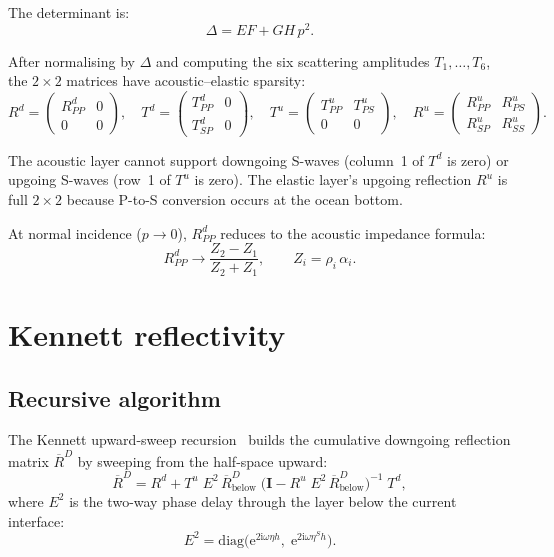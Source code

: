 \documentclass[11pt,a4paper]{article}
\newcommand{\D}{\Delta}
\newcommand{\ee}{\mathrm{e}}
\newcommand{\ii}{\mathrm{i}}
\begin{document}
The determinant is:
\begin{equation}
  \D = EF + GH\,p^2.
\end{equation}

After normalising by $\D$ and computing the six scattering amplitudes
$T_1, \ldots, T_6$, the $2\times 2$ matrices have
acoustic--elastic sparsity:
\begin{equation}\label{eq:Rd_sparse}
  R^d = \begin{pmatrix} R^d_{PP} & 0 \\ 0 & 0 \end{pmatrix}, \quad
  T^d = \begin{pmatrix} T^d_{PP} & 0 \\ T^d_{SP} & 0 \end{pmatrix}, \quad
  T^u = \begin{pmatrix} T^u_{PP} & T^u_{PS} \\ 0 & 0 \end{pmatrix}, \quad
  R^u = \begin{pmatrix} R^u_{PP} & R^u_{PS} \\ R^u_{SP} & R^u_{SS} \end{pmatrix}.
\end{equation}

The acoustic layer cannot support downgoing S-waves (column~1 of
$T^d$ is zero) or upgoing S-waves (row~1 of $T^u$ is zero).  The
elastic layer's upgoing reflection $R^u$ is full $2 \times 2$
because P-to-S conversion occurs at the ocean bottom.

At normal incidence ($p \to 0$), $R^d_{PP}$ reduces to the
acoustic impedance formula:
\begin{equation}\label{eq:impedance}
  R^d_{PP} \to \frac{Z_2 - Z_1}{Z_2 + Z_1}, \qquad
  Z_i = \rho_i\,\alpha_i.
\end{equation}

\section{Kennett reflectivity}
\label{sec:kennett}

\subsection{Recursive algorithm}

The Kennett upward-sweep recursion~\cite{kennett1983} builds
the cumulative downgoing reflection matrix $\overline{R}^D$
by sweeping from the half-space upward:
\begin{equation}\label{eq:kennett}
  \overline{R}^D = R^d + T^u\;E^2\,\overline{R}^D_{\text{below}}\;
    \bigl(\bm{I} - R^u\;E^2\,\overline{R}^D_{\text{below}}\bigr)^{-1}\;T^d,
\end{equation}
where $E^2$ is the two-way phase delay through the layer below
the current interface:
\begin{equation}
  E^2 = \text{diag}\bigl(\ee^{2\ii\omega\eta h},\;
    \ee^{2\ii\omega\eta^S h}\bigr).
\end{equation}
\end{document}
